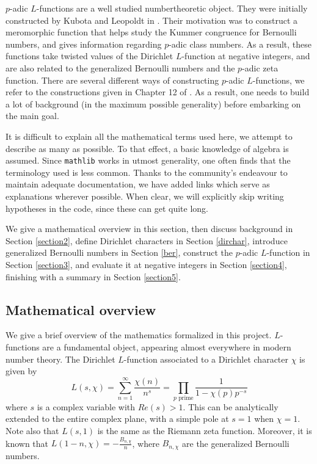\documentclass[a4paper,UKenglish,cleveref, autoref, thm-restate]{lipics-v2021}
\newcommand{\lean}[1]{\texttt{#1}\xspace} %
\begin{document}
$p$-adic $L$-functions are a well studied numbertheoretic object. They were initially constructed 
by Kubota and Leopoldt in \cite{KL}. Their motivation was to construct a meromorphic function that helps study 
the Kummer congruence for Bernoulli numbers, and gives information regarding $p$-adic class numbers. 
As a result, these functions take twisted values of the Dirichlet $L$-function at negative integers, and 
are also related to the generalized Bernoulli numbers and the $p$-adic zeta function. There are several different ways of 
constructing $p$-adic $L$-functions, we refer to the constructions
given in Chapter 12 of \cite{cyc}. As a result, one needs to build a lot of background (in the maximum possible generality) 
before embarking on the main goal.

It is difficult to explain all the mathematical terms used here, we attempt to describe as many as possible. To that effect, 
a basic knowledge of algebra is assumed. Since \lean{mathlib} works in utmost generality, one often finds that the terminology 
used is less common. Thanks to the community's endeavour to maintain adequate documentation, we have added links which serve as 
explanations wherever possible. When clear, we will explicitly skip writing hypotheses in the code, since these can get quite long.

We give a mathematical overview in this section, then discuss background in Section \ref{section2}, define Dirichlet characters in Section \ref{dirchar}, 
introduce generalized Bernoulli numbers in Section \ref{ber}, construct the $p$-adic $L$-function in Section \ref{section3}, and evaluate it at negative integers in Section \ref{section4}, finishing with a summary in Section \ref{section5}. 
\subsection{Mathematical overview}
We give a brief overview of the mathematics formalized in this project. 
$L$-functions are a fundamental object, appearing almost everywhere in modern 
number theory. The Dirichlet $L$-function associated to a Dirichlet character $\chi$ is given by  
$$ L(s, \chi) = \sum_{n = 1}^{\infty} \frac{\chi (n)}{n^s} = \prod_{p \text{ prime}} \frac{1}{1 - \chi (p) p^{-s}}$$
where $s$ is a complex variable with $Re(s) > 1$. This can be analytically extended 
to the entire complex plane, with a simple pole at $s = 1$ when $\chi = 1$. Note also 
that $L(s, 1)$ is the same as the Riemann zeta function. Moreover, it is known that 
$L(1 - n, \chi) = - \frac{B_{n, \chi}}{n}$, where $B_{n, \chi}$ are the generalized 
Bernoulli numbers. 
\end{document}
